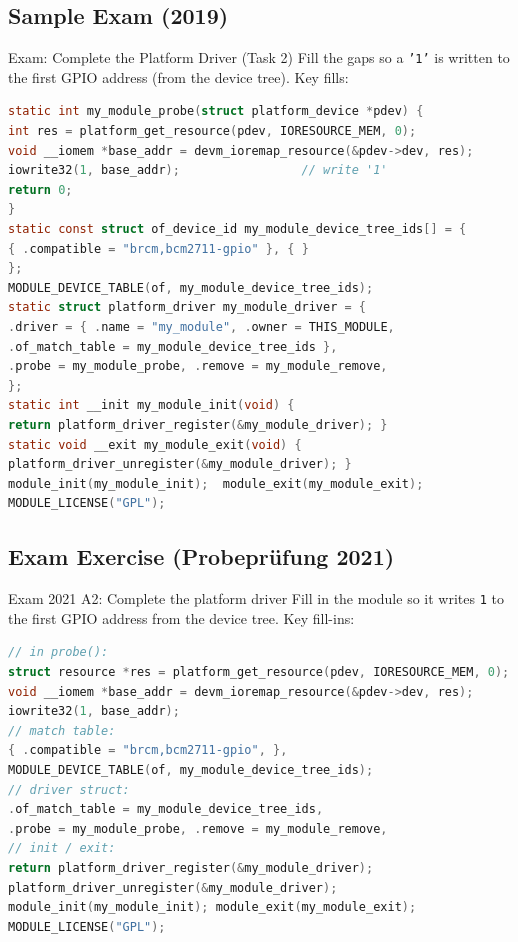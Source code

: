 \subsection{Sample Exam (2019)}

\begin{example2}{Exam: Complete the Platform Driver (Task 2)}
    Fill the gaps so a \texttt{'1'} is written to the first GPIO address (from the
    device tree). Key fills:
    \tcblower
\begin{lstlisting}[language=C, style=basesmol, aboveskip=2pt, belowskip=2pt]
static int my_module_probe(struct platform_device *pdev) {
int res = platform_get_resource(pdev, IORESOURCE_MEM, 0);
void __iomem *base_addr = devm_ioremap_resource(&pdev->dev, res);
iowrite32(1, base_addr);                 // write '1'
return 0;
}
static const struct of_device_id my_module_device_tree_ids[] = {
{ .compatible = "brcm,bcm2711-gpio" }, { }
};
MODULE_DEVICE_TABLE(of, my_module_device_tree_ids);
static struct platform_driver my_module_driver = {
.driver = { .name = "my_module", .owner = THIS_MODULE,
.of_match_table = my_module_device_tree_ids },
.probe = my_module_probe, .remove = my_module_remove,
};
static int __init my_module_init(void) {
return platform_driver_register(&my_module_driver); }
static void __exit my_module_exit(void) {
platform_driver_unregister(&my_module_driver); }
module_init(my_module_init);  module_exit(my_module_exit);
MODULE_LICENSE("GPL");
\end{lstlisting}
\end{example2}

\subsection{Exam Exercise (Probepr\"ufung 2021)}

\begin{example2}{Exam 2021 A2: Complete the platform driver}
    Fill in the module so it writes \texttt{1} to the first GPIO address from the
    device tree. Key fill-ins:
    \tcblower
\begin{lstlisting}[language=C, style=basesmol, aboveskip=2pt, belowskip=2pt]
// in probe():
struct resource *res = platform_get_resource(pdev, IORESOURCE_MEM, 0);
void __iomem *base_addr = devm_ioremap_resource(&pdev->dev, res);
iowrite32(1, base_addr);
// match table:
{ .compatible = "brcm,bcm2711-gpio", },
MODULE_DEVICE_TABLE(of, my_module_device_tree_ids);
// driver struct:
.of_match_table = my_module_device_tree_ids,
.probe = my_module_probe, .remove = my_module_remove,
// init / exit:
return platform_driver_register(&my_module_driver);
platform_driver_unregister(&my_module_driver);
module_init(my_module_init); module_exit(my_module_exit);
MODULE_LICENSE("GPL");
\end{lstlisting}
\end{example2}

\raggedcolumns
